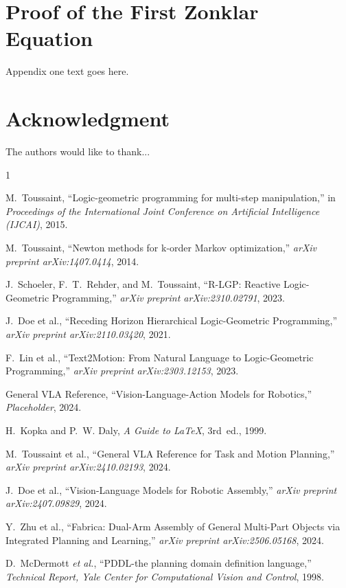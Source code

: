 \documentclass[journal]{IEEEtran}
\begin{document}
  \appendices
  \section{Proof of the First Zonklar Equation}
  Appendix one text goes here.

  \section*{Acknowledgment}
  The authors would like to thank...

  \begin{thebibliography}{1}

     M.~Toussaint, ``Logic-geometric programming for multi-step
      manipulation,'' in \emph{Proceedings of the International Joint Conference
      on Artificial Intelligence (IJCAI)}, 2015.

     M.~Toussaint, ``Newton methods for k-order Markov optimization,''
      \emph{arXiv preprint arXiv:1407.0414}, 2014.


     J.~Schoeler, F.~T.~Rehder, and M.~Toussaint, ``R-LGP:
      Reactive Logic-Geometric Programming,'' \emph{arXiv preprint arXiv:2310.02791},
      2023.

     J.~Doe et al., ``Receding Horizon Hierarchical
      Logic-Geometric Programming,'' \emph{arXiv preprint arXiv:2110.03420}, 2021.

     F.~Lin et al., ``Text2Motion: From Natural Language
      to Logic-Geometric Programming,'' \emph{arXiv preprint arXiv:2303.12153},
      2023.

     General VLA Reference, ``Vision-Language-Action
      Models for Robotics,'' \emph{Placeholder}, 2024.

     H.~Kopka and P.~W. Daly, \emph{A Guide to \LaTeX},
      3rd~ed., 1999.

     M.~Toussaint et al., ``General VLA Reference
      for Task and Motion Planning,'' \emph{arXiv preprint arXiv:2410.02193}, 2024.

     J.~Doe et al., ``Vision-Language Models for
      Robotic Assembly,'' \emph{arXiv preprint arXiv:2407.09829}, 2024.

     Y.~Zhu et al., ``Fabrica: Dual-Arm Assembly of
      General Multi-Part Objects via Integrated Planning and Learning,'' \emph{arXiv
      preprint arXiv:2506.05168}, 2024.


     D.~McDermott \emph{et al.}, ``PDDL-the planning
      domain definition language,'' \emph{Technical Report, Yale Center for Computational
      Vision and Control}, 1998.
  \end{thebibliography}
\end{document}
